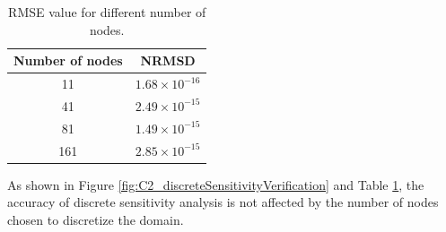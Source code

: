 %
%
\begin{table}[H]
\centering
\begin{tabular}{| c | c |}
    \hline
    Number of nodes & NRMSD \\ \hline \hline
    11 & $1.68 \times 10^{-16}$ \\ \hline
    41 & $2.49 \times 10^{-15}$ \\ \hline
    81 & $1.49 \times 10^{-15}$ \\ \hline
    161 & $2.85 \times 10^{-15}$ \\ \hline
\end{tabular}
\caption{RMSE value for different number of nodes.}
\label{table:C2_DSA_NRMSD}
\end{table}
%
As shown in Figure \ref{fig:C2_discreteSensitivityVerification} and Table \ref{table:C2_DSA_NRMSD}, the accuracy of discrete sensitivity analysis is not affected by the number of nodes chosen to discretize the domain.

